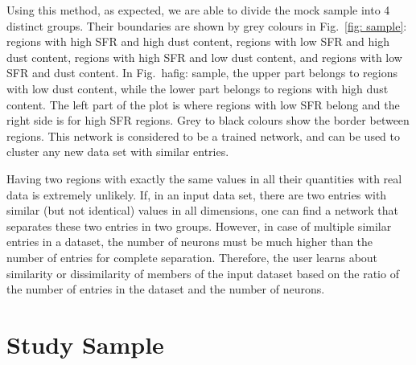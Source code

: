 Using this method, as expected, we are able to divide the mock sample into 4 distinct groups. Their boundaries are shown by grey colours in Fig.~\ref{fig: sample}: regions with high SFR and high dust content, regions with low SFR and high dust content, regions with high SFR and low dust content, and regions with low SFR and dust content. 
In Fig.~ ha{fig: sample}, the upper part belongs to regions with low dust content, while the lower part belongs to regions with high dust content.
The left part of the plot is where regions with low SFR belong and the right side is for high SFR regions.
Grey to black colours show the border between regions.
This network is considered to be a trained network, and can be used to cluster any new data set with similar entries.

Having two regions with exactly the same values in all their quantities with real data is extremely unlikely. 
If, in an input data set, there are two entries with similar (but not identical) values in all dimensions, one can find a network that separates these two entries in two groups.  
However, in case of multiple similar entries in a dataset, the number of neurons must be much higher than the number of entries for complete separation.
Therefore, the user learns about similarity or dissimilarity of members of the input dataset based on the ratio of the number of entries in the dataset and  the number of neurons. 

\section{Study Sample}
\label{Sec: data_SOMN}

